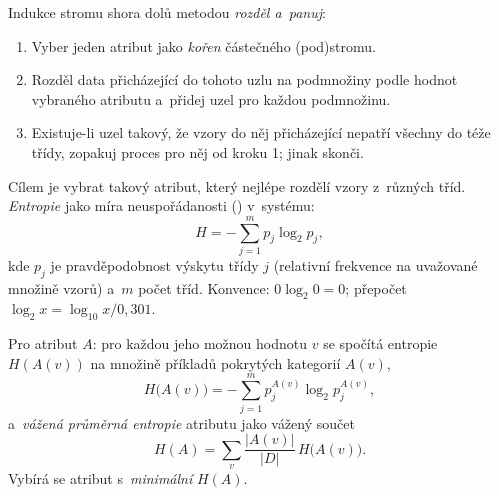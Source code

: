 \documentclass[11pt,a4paper]{article}
\theoremstyle{definition}
\begin{document}
\begin{defbox}
Indukce stromu shora dolů metodou \emph{rozděl a~panuj}:
\begin{enumerate}
\item Vyber jeden atribut jako \emph{kořen} částečného (pod)stromu.
\item Rozděl data přicházející do tohoto uzlu na podmnožiny podle hodnot vybraného atributu
      a~přidej uzel pro každou podmnožinu.
\item Existuje-li uzel takový, že vzory do něj přicházející nepatří všechny do téže třídy,
      zopakuj proces pro něj od kroku 1; jinak skonči.
\end{enumerate}
\end{defbox}

\begin{defbox}
Cílem je vybrat takový atribut, který nejlépe rozdělí vzory z~různých tříd. \emph{Entropie}
jako míra neuspořádanosti () v~systému:
\[ H=-\sum_{j=1}^{m}p_j\log_2 p_j, \]
kde $p_j$ je pravděpodobnost výskytu třídy $j$ (relativní frekvence na uvažované množině
vzorů) a~$m$ počet tříd. Konvence: $0\log_2 0=0$; přepočet
$\log_2 x=\log_{10}x/0{,}301$.

Pro atribut $A$: pro každou jeho možnou hodnotu $v$ se spočítá entropie $H(A(v))$ na množině
příkladů pokrytých kategorií $A(v)$,
\[ H\big(A(v)\big)=-\sum_{j=1}^{m}p_j^{A(v)}\log_2 p_j^{A(v)}, \]
a~\emph{vážená průměrná entropie} atributu jako vážený součet
\[ H(A)=\sum_{v}\frac{|A(v)|}{|D|}\,H\big(A(v)\big). \]
Vybírá se atribut s~\emph{minimální} $H(A)$.
\end{defbox}
\end{document}
